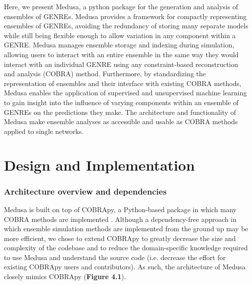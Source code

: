 \documentclass[11pt,onecolumn,notitlepage,openany,twoside]{book}
\begin{document}
\begin{refsection}
Here, we present Medusa, a python package for the generation and analysis of ensembles of GENREs. Medusa provides a framework for compactly representing ensembles of GENREs, avoiding the redundancy of storing many separate models while still being flexible enough to allow variation in any component within a GENRE. Medusa manages ensemble storage and indexing during simulation, allowing users to interact with an entire ensemble in the same way they would interact with an individual GENRE using any constraint-based reconstruction and analysis (COBRA) method. Furthermore, by standardizing the representation of ensembles and their interface with existing COBRA methods, Medusa enables the application of supervised and unsupervised machine learning to gain insight into the influence of varying components within an ensemble of GENREs on the predictions they make. The architecture and functionality of Medusa make ensemble analyses as accessible and usable as COBRA methods applied to single networks.


\section{Design and Implementation}
\subsubsection{Architecture overview and dependencies}

Medusa is built on top of COBRApy, a Python-based package in which many COBRA methods are implemented \cite{Ebrahim2013-eb}. Although a dependency-free approach in which ensemble simulation methods are implemented from the ground up may be more efficient, we chose to extend COBRApy to greatly decrease the size and complexity of the codebase and to reduce the domain-specific knowledge required to use Medusa and understand the source code (i.e. decrease the effort for existing COBRApy users and contributors). As such, the architecture of Medusa closely mimics COBRApy (\textbf{Figure 4.1}).


\end{refsection}
\end{document}
